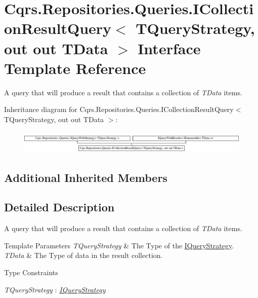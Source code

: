 \hypertarget{interfaceCqrs_1_1Repositories_1_1Queries_1_1ICollectionResultQuery}{}\section{Cqrs.\+Repositories.\+Queries.\+I\+Collection\+Result\+Query$<$ T\+Query\+Strategy, out out T\+Data $>$ Interface Template Reference}
\label{interfaceCqrs_1_1Repositories_1_1Queries_1_1ICollectionResultQuery}


A query that will produce a result that contains a collection of {\itshape T\+Data}  items.  


Inheritance diagram for Cqrs.\+Repositories.\+Queries.\+I\+Collection\+Result\+Query$<$ T\+Query\+Strategy, out out T\+Data $>$\+:\begin{figure}[H]
\begin{center}
\leavevmode
\includegraphics[height=1.117764cm]{interfaceCqrs_1_1Repositories_1_1Queries_1_1ICollectionResultQuery}
\end{center}
\end{figure}
\subsection*{Additional Inherited Members}


\subsection{Detailed Description}
A query that will produce a result that contains a collection of {\itshape T\+Data}  items. 


\begin{DoxyTemplParams}{Template Parameters}
{\em T\+Query\+Strategy} & The Type of the \hyperlink{interfaceCqrs_1_1Repositories_1_1Queries_1_1IQueryStrategy}{I\+Query\+Strategy}.\\
\hline
{\em T\+Data} & The Type of data in the result collection.\\
\hline
\end{DoxyTemplParams}
\begin{Desc}
\item[Type Constraints]\begin{description}
\item[{\em T\+Query\+Strategy} : {\em \hyperlink{interfaceCqrs_1_1Repositories_1_1Queries_1_1IQueryStrategy}{I\+Query\+Strategy}}]\end{description}
\end{Desc}
